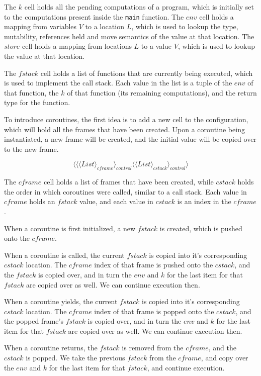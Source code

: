 \documentclass[review,twocolumn,preprint]{sigplanconf}
\begin{document}
The $k$ cell holds all the pending computations of a program, which is initially set to the computations present inside the \verb!main! function. The $env$ cell holds a mapping from variables $V$ to a location $L$, which is used to lookup the type, mutability, references held and move semantics of the value at that location. The $store$ cell holds a mapping from locations $L$ to a value $V$, which is used to lookup the value at that location.

The $fstack$ cell holds a list of functions that are currently being executed, which is used to implement the call stack. Each value in the list is a tuple of the $env$ of that function, the $k$ of that function (its remaining computations), and the return type for the function.

To introduce coroutines, the first idea is to add a new cell to the configuration, which will hold all the frames that have been created. Upon a coroutine being instantiated, a new frame will be created, and the initial value will be copied over to the new frame.

\[
  \Biggl \langle
  \langle \langle List \rangle_{cframe} \rangle_{control}
  \langle \langle List \rangle_{cstack} \rangle_{control}
  \Biggr \rangle
\]

The $cframe$ cell holds a list of frames that have been created, while $cstack$ holds the order in which coroutines were called, similar to a call stack. Each value in $cframe$ holds an $fstack$ value, and each value in $cstack$ is an index in the $cframe$.

When a coroutine is first initialized, a new $fstack$ is created, which is pushed onto the $cframe$.

When a coroutine is called, the current $fstack$ is copied into it's corresponding $cstack$ location. The $cframe$ index of that frame is pushed onto the $cstack$, and the $fstack$ is copied over, and in turn the $env$ and $k$ for the last item for that $fstack$ are copied over as well. We can continue execution then.

When a coroutine yields, the current $fstack$ is copied into it's corresponding $cstack$ location. The $cframe$ index of that frame is popped onto the $cstack$, and the popped frame's $fstack$ is copied over, and in turn the $env$ and $k$ for the last item for that $fstack$ are copied over as well. We can continue execution then.

When a coroutine returns, the $fstack$ is removed from the $cframe$, and the $cstack$ is popped. We take the previous $fstack$ from the $cframe$, and copy over the $env$ and $k$ for the last item for that $fstack$, and continue execution.
\end{document}
